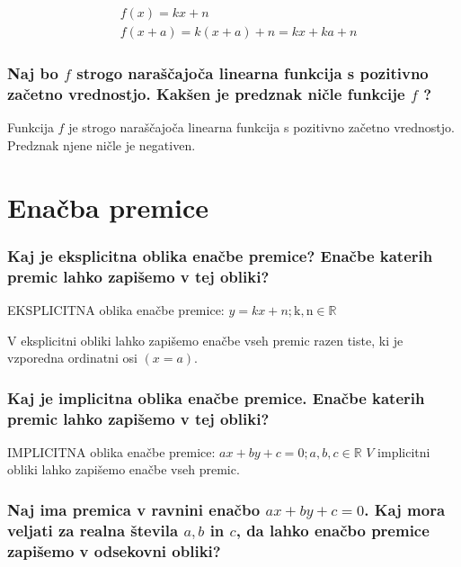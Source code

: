 \documentclass{article}
\begin{document}
$$
\begin{aligned}
& f(x)=k x+n \\
& f(x+a)=k(x+a)+n=k x+k a+n
\end{aligned}
$$

\subsubsection*{Naj bo $f$ strogo naraščajoča linearna funkcija s pozitivno začetno vrednostjo. Kakšen je predznak ničle funkcije $f$ ?}

Funkcija $f$ je strogo naraščajoča linearna funkcija s pozitivno začetno vrednostjo. Predznak njene ničle je negativen.
\begin{center}
\end{center}

\section{Enačba premice}
\subsubsection*{Kaj je eksplicitna oblika enačbe premice? Enačbe katerih premic lahko zapišemo v tej obliki?}

EKSPLICITNA oblika enačbe premice: $y=k x+n ; \mathrm{k}, \mathrm{n} \in \mathbb{R}$

V eksplicitni obliki lahko zapišemo enačbe vseh premic razen tiste, ki je vzporedna ordinatni osi $(x=a)$.

\subsubsection*{Kaj je implicitna oblika enačbe premice. Enačbe katerih premic lahko zapišemo v tej obliki?}

IMPLICITNA oblika enačbe premice: $a x+b y+c=0 ; a, b, c \in \mathbb{R}$ $V$ implicitni obliki lahko zapišemo enačbe vseh premic.

\subsubsection*{Naj ima premica v ravnini enačbo $a x+b y+c=0$. Kaj mora veljati za realna števila $a, b$ in $c$, da lahko enačbo premice zapišemo v odsekovni obliki?}
\end{document}
